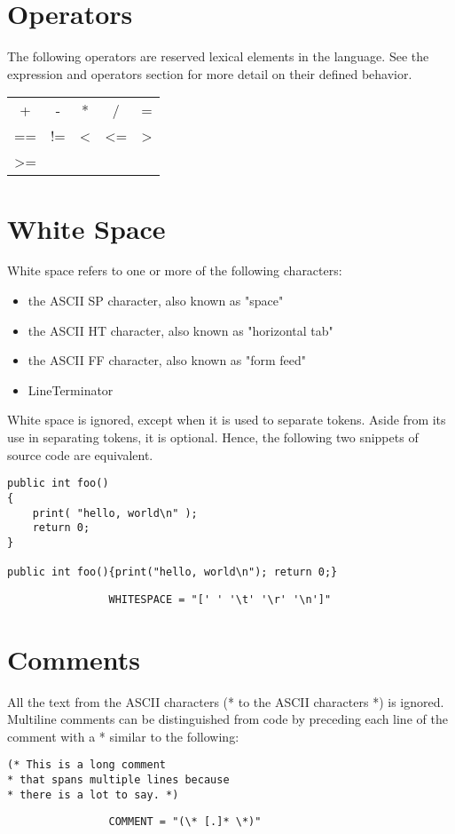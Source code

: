 \begin{homeworkProblem}
	\section{Operators}
	The following operators are reserved lexical elements in the language. See the expression and operators section for more detail on their defined behavior.
	\begin{center}
		\begin{tabular}{ccccc}
			+ & - & * & / & = \\
			== & != & \textless & \textless= & \textgreater \\
			\textgreater= 
		\end{tabular}
	\end{center}
 	
	\section{White Space}
	White space refers to one or more of the following characters:
	\begin{itemize}
		\item the ASCII SP character, also known as "space"
		\item the ASCII HT character, also known as "horizontal tab"
		\item the ASCII FF character, also known as "form feed"
		\item LineTerminator
	\end{itemize}
	White space is ignored, except when it is used to separate tokens. Aside from its use in separating tokens, it is optional. Hence, the following two snippets of source code are equivalent.
	
	\begin{verbatim}
public int foo()
{
	print( "hello, world\n" );
	return 0;
}

public int foo(){print("hello, world\n"); return 0;}
	\end{verbatim}
	
	\begin{verbatim}
				WHITESPACE = "[' ' '\t' '\r' '\n']"
 	\end{verbatim}
	
	\section{Comments}
	All the text from the ASCII characters (* to the ASCII characters *) is ignored. Multiline comments can be distinguished from code by preceding each line of the comment with a * similar to the following:
	\begin{verbatim}
(* This is a long comment 
* that spans multiple lines because
* there is a lot to say. *)
	\end{verbatim}

	\begin{verbatim}
				COMMENT = "(\* [.]* \*)"
	\end{verbatim}

\end{homeworkProblem}